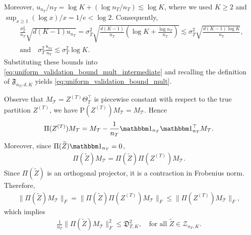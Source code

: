 \documentclass[10pt]{article}
\newcommand{\wt}{\widetilde}
\newcommand{\calT}{\mathcal T}
\newcommand{\trg}{T}
\newcommand{\nT}{n_{\trg}}
\newcommand{\sigmaT}{\sigma_{\trg}}
\newcommand{\Ztar}{Z^{(\trg)}}
\newcommand{\ThetaT}{\Theta_{\trg}}
\begin{document}
Moreover, $u_{\nT}/\nT=\log K+(\log\nT/\nT) \lesssim \log K$, where we used $K\ge2$ and
$\sup_{x\ge1}(\log x)/x=1/e<\log2$. Consequently,
\begin{align}
&\frac{\sigmaT^2}{\nT}\sqrt{d(K-1)u_{\nT}}
=\sigmaT^2\sqrt{\frac{d(K-1)}{\nT}\left(\log K+\frac{\log\nT}{\nT}\right)}\lesssim\sigmaT^2\sqrt{\frac{d(K-1)\log K}{\nT}}, \\
&\mbox{and} \quad \sigmaT^2\frac{u_{\nT}}{\nT}\lesssim \sigmaT^2\log K.
\end{align}
Substituting these bounds into
\eqref{eq:uniform_validation_bound_mult_intermediate} and recalling the
definition of $\mathfrak F_{\nT,d,K}$ yields
\eqref{eq:uniform_validation_bound_mult}.

Observe that $M_\calT=\Ztar\ThetaT^\top$ is piecewise constant with respect to the true partition $\Ztar$, we have $\mathrm P(\Ztar)M_\calT=M_\calT$. Hence
\begin{align}
\Pi(\Ztar)M_\calT=M_\calT-\frac{1}{\nT}\mathbbm 1_{\nT}\mathbbm 1_{\nT}^\top M_\calT.
\end{align}
Moreover, since $\Pi(\wt Z)\mathbbm 1_{\nT}=0$,
\begin{align}
\Pi(\wt Z)M_\calT=\Pi(\wt Z)\Pi(\Ztar)M_\calT.
\end{align}
Since $\Pi(\wt Z)$ is an orthogonal projector, it is a contraction in Frobenius
norm. Therefore,
\begin{align}
\|\Pi(\wt Z)M_\calT\|_F=\|\Pi(\wt Z)\Pi(\Ztar)M_\calT\|_F\le\|\Pi(\Ztar)M_\calT\|_F,
\end{align}
which implies
\begin{align}
\label{eq:oracle_maximality_validation_mult}
    \frac{1}{\nT}\|\Pi(\wt Z)M_\calT\|_F^2\le \mathfrak D_{\trg,K}^2,
    \quad \mbox{for all $\wt Z\in\mathcal Z_{\nT,K}$.}
\end{align}
\end{document}
